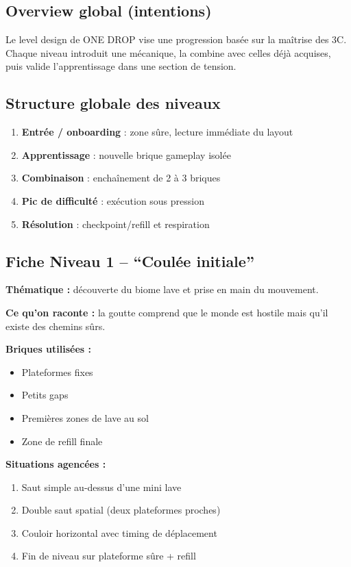 ﻿\documentclass[12pt,a4paper]{article}
\begin{document}
\subsection{Overview global (intentions)}
Le level design de ONE DROP vise une progression basée sur la maîtrise des 3C. Chaque niveau introduit une mécanique, la combine avec celles déjà acquises, puis valide l'apprentissage dans une section de tension.

\subsection{Structure globale des niveaux}
\begin{enumerate}[noitemsep]
    \item \textbf{Entrée / onboarding} : zone sûre, lecture immédiate du layout
    \item \textbf{Apprentissage} : nouvelle brique gameplay isolée
    \item \textbf{Combinaison} : enchaînement de 2 à 3 briques
    \item \textbf{Pic de difficulté} : exécution sous pression
    \item \textbf{Résolution} : checkpoint/refill et respiration
\end{enumerate}

\subsection{Fiche Niveau 1 -- ``Coulée initiale''}
\textbf{Thématique :} découverte du biome lave et prise en main du mouvement.

\textbf{Ce qu'on raconte :} la goutte comprend que le monde est hostile mais qu'il existe des chemins sûrs.

\textbf{Briques utilisées :}
\begin{itemize}[noitemsep]
    \item Plateformes fixes
    \item Petits gaps
    \item Premières zones de lave au sol
    \item Zone de refill finale
\end{itemize}

\textbf{Situations agencées :}
\begin{enumerate}[noitemsep]
    \item Saut simple au-dessus d'une mini lave
    \item Double saut spatial (deux plateformes proches)
    \item Couloir horizontal avec timing de déplacement
    \item Fin de niveau sur plateforme sûre + refill
\end{enumerate}
\end{document}
